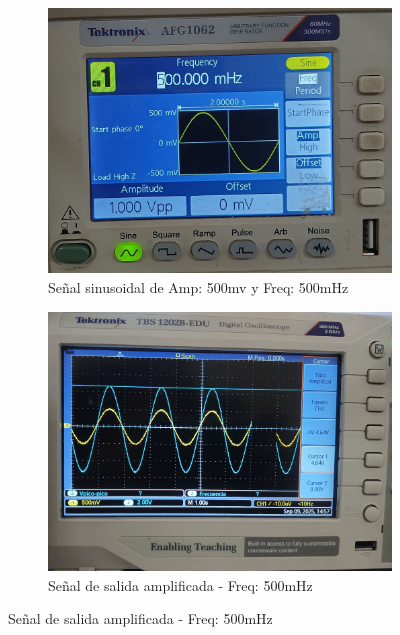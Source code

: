 \begin{figure}[h]
	\begin{subfigure}[b]{0.45\linewidth}
		\centering
		\includegraphics[width=\linewidth]{"media/MODO COMUN/senial-500mhz-inicial"}
		\caption{Señal sinusoidal de Amp: 500mv y Freq: 500mHz}
		\label{fig:senial-500mhz-inicial}
	\end{subfigure}
	\hfill
	\begin{subfigure}[b]{0.45\linewidth}
		\centering
		\includegraphics[width=\linewidth]{"media/MODO DIFERENCIAL/senial-500mhz-out"}
		\caption{Señal de salida amplificada - Freq: 500mHz}
		\label{fig:senial-500mhz-out}
	\end{subfigure}
\end{figure}


